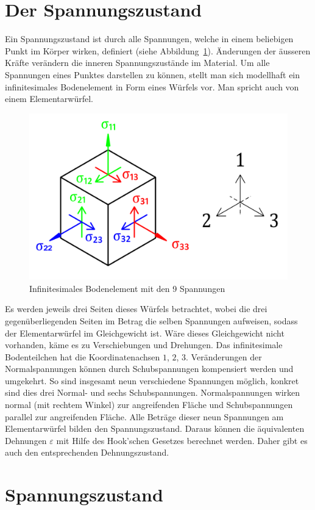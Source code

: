 \section{Der Spannungszustand\label{spannung:section:Der Spannungsustand}}
Ein Spannungszustand ist durch alle Spannungen, welche in einem beliebigen Punkt im Körper wirken, definiert (siehe Abbildung~\ref{fig:Bild2}).
Änderungen der äusseren Kräfte verändern die inneren Spannungszustände im Material.
Um alle Spannungen eines Punktes darstellen zu können,
stellt man sich modellhaft ein infinitesimales Bodenelement in Form eines Würfels vor.
Man spricht auch von einem Elementarwürfel.

\begin{figure}
	\centering
	\includegraphics[width=0.4\linewidth,keepaspectratio]{papers/spannung/Grafiken/Bild2.png}
	\caption{Infinitesimales Bodenelement mit den 9 Spannungen}
	\label{fig:Bild2}
\end{figure}

Es werden jeweils drei Seiten dieses Würfels betrachtet, wobei die drei gegenüberliegenden Seiten im Betrag die selben Spannungen aufweisen,
sodass der Elementarwürfel im Gleichgewicht ist.
Wäre dieses Gleichgewicht nicht vorhanden, käme es zu Verschiebungen und Drehungen.
Das infinitesimale Bodenteilchen hat die Koordinatenachsen $1$, $2$, $3$.
%
%
Veränderungen der Normalspannungen können durch Schubspannungen kompensiert werden und umgekehrt.
So sind insgesamt neun verschiedene Spannungen möglich, konkret sind dies drei Normal- und sechs Schubspannungen.
Normalspannungen wirken normal (mit rechtem Winkel) zur angreifenden Fläche und Schubspannungen parallel zur angreifenden Fläche.
Alle Beträge dieser neun Spannungen am Elementarwürfel bilden den Spannungszustand.
Daraus können die äquivalenten Dehnungen $\varepsilon$ mit Hilfe des Hook'schen Gesetzes berechnet werden.
Daher gibt es auch den entsprechenden Dehnungszustand.


\section{Spannungszustand\label{spannung:section:Spannungsustand}}

